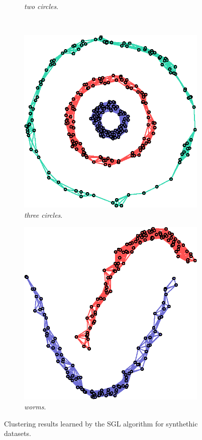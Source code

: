 \begin{figure}[!htb]
\begin{subfigure}[b]{0.23\textwidth}
      \caption{\textit{two circles}.}
    \end{subfigure}
    ~
    \begin{subfigure}[b]{0.23\textwidth}
      \includegraphics[width=\textwidth]{clusters/latex/figures/circles3.eps}
      \caption{\textit{three circles}.}
    \end{subfigure}
    \begin{subfigure}[b]{0.23\textwidth}
      \includegraphics[width=\textwidth]{clusters/latex/figures/worms.eps}
      \caption{\textit{worms}.}
    \end{subfigure}
    \caption{Clustering results learned by the \textsf{SGL} algorithm for synthethic datasets.}
    \label{fig:clusters}
\end{figure}

